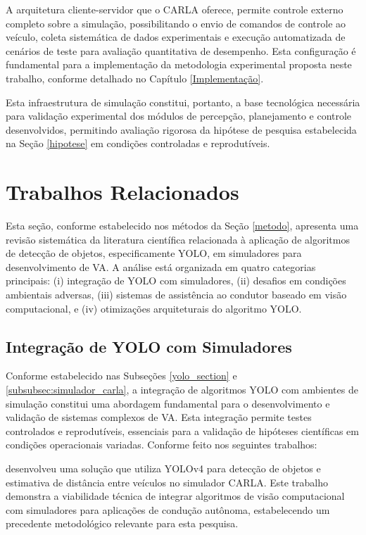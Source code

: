 A arquitetura cliente-servidor que o CARLA oferece, permite controle externo completo sobre a simulação, possibilitando o envio de comandos de controle ao veículo, coleta sistemática de dados experimentais e execução automatizada de cenários de teste para avaliação quantitativa de desempenho. Esta configuração é fundamental para a implementação da metodologia experimental proposta neste trabalho, conforme detalhado no Capítulo \ref{Implementação}.

Esta infraestrutura de simulação constitui, portanto, a base tecnológica necessária para validação experimental dos módulos de percepção, planejamento e controle desenvolvidos, permitindo avaliação rigorosa da hipótese de pesquisa estabelecida na Seção \ref{hipotese} em condições controladas e reprodutíveis.

\section{Trabalhos Relacionados} \label{trabalhos_relacionados}

Esta seção, conforme estabelecido nos métodos da Seção \ref{metodo}, apresenta uma revisão sistemática da literatura científica relacionada à aplicação de algoritmos de detecção de objetos, especificamente YOLO, em simuladores para desenvolvimento de VA. A análise está organizada em quatro categorias principais: (i) integração de YOLO com simuladores, (ii) desafios em condições ambientais adversas, (iii) sistemas de assistência ao condutor baseado em visão computacional, e (iv) otimizações arquiteturais do algoritmo YOLO.

\subsection{Integração de YOLO com Simuladores}

Conforme estabelecido nas Subseções \ref{yolo_section} e \ref{subsubsec:simulador_carla}, a integração de algoritmos YOLO com ambientes de simulação constitui uma abordagem fundamental para o desenvolvimento e validação de sistemas complexos de VA. Esta integração permite testes controlados e reprodutíveis, essenciais para a validação de hipóteses científicas em condições operacionais variadas. Conforme feito nos seguintes trabalhos:

 desenvolveu uma solução que utiliza YOLOv4 para detecção de objetos e estimativa de distância entre veículos no simulador CARLA. Este trabalho demonstra a viabilidade técnica de integrar algoritmos de visão computacional com simuladores para aplicações de condução autônoma, estabelecendo um precedente metodológico relevante para esta pesquisa.

